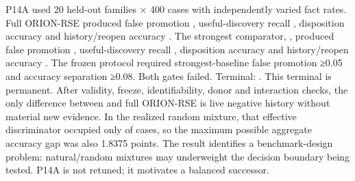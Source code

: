 \markdownRendererDocumentBegin
\markdownRendererSectionBegin
{}\markdownRendererInterblockSeparator
{}P14A used 20 held-out families × 400 cases with independently varied fact rates. Full ORION-RSE produced false promotion , useful-discovery recall , disposition accuracy  and history/reopen accuracy .\markdownRendererInterblockSeparator
{}The strongest comparator, , produced false promotion , useful-discovery recall , disposition accuracy  and history/reopen accuracy .\markdownRendererInterblockSeparator
{}The frozen protocol required strongest-baseline false promotion ≥0.05 and accuracy separation ≥0.08. Both gates failed. Terminal: . This terminal is permanent.\markdownRendererInterblockSeparator
{}\markdownRendererSectionBegin
{}\markdownRendererInterblockSeparator
{}After validity, freeze, identifiability, donor and interaction checks, the only difference between  and full ORION-RSE is live negative history without material new evidence. In the realized random mixture, that effective discriminator occupied only \markdownRendererStrongEmphasis{1.8375\markdownRendererPercentSign{}} of cases, so the maximum possible aggregate accuracy gap was also 1.8375 points. The result identifies a benchmark-design problem: natural/random mixtures may underweight the decision boundary being tested. P14A is not retuned; it motivates a balanced successor.
\markdownRendererSectionEnd 
\markdownRendererSectionEnd \markdownRendererDocumentEnd